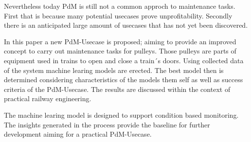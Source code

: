 Nevertheless today PdM is still not a common approch to maintenance tasks. First that is because many potential usecases prove unprofitability. Secondly there is an anticipated large amount of usecases that has not yet been discovered.

In this paper a new PdM-Usecase is proposed; aiming to provide an improved concept to carry out maintenance tasks for pulleys. Those pulleys are parts of equipment used in trains to open and close a train´s doors. Using collected data of the system machine learing models are erected. The best model then is determined considering characteristics of the models them self as well as success criteria of the PdM-Usecase. The results are discussed within the context of practical railway engineering.

The machine learing model is designed to support condition based monitoring. The insights generated in the process provide the baseline for further development aiming for a practical PdM-Usecase.
\clearpage